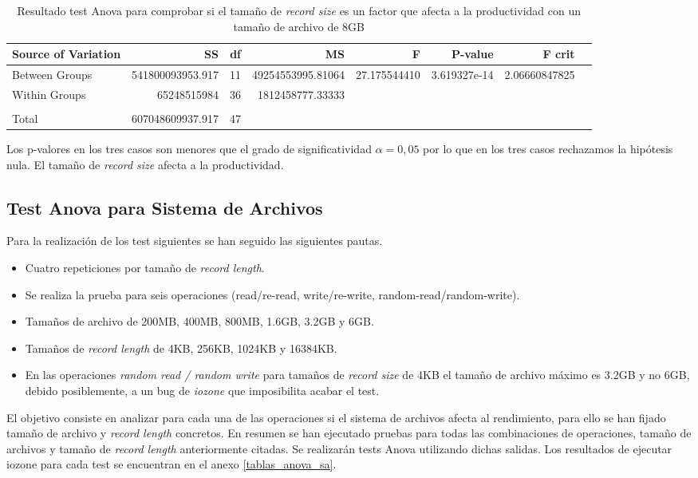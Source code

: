 \begin{table}[!htp]\centering

\scriptsize
\begin{tabular}{lrrrrrrr}\toprule
Source of Variation &SS &df &MS &F &P-value &F crit \\\midrule
Between Groups &541800093953.917 &11 &49254553995.81064 &27.175544410 &3.619327e-14 &2.06660847825 \\
Within Groups &65248515984 &36 &1812458777.33333 & & & \\
& & & & & & \\
Total &607048609937.917 &47 & & & & \\
\bottomrule
\end{tabular}
\caption{Resultado test Anova para comprobar si el tamaño de \textit{record size} es un factor que afecta a la productividad con un tamaño de archivo de 8GB}\label{tab: }
\end{table}


Los p-valores en los tres casos son menores que el grado de significatividad $\alpha = 0,05$ por lo que en los tres casos rechazamos la hipótesis nula. El tamaño de \textit{record size} afecta a la productividad.

\subsection{Test Anova para Sistema de Archivos}
Para la realización de los test siguientes se han seguido las siguientes pautas.
\begin{itemize}
    \item Cuatro repeticiones por tamaño de \textit{record length}.
    \item Se realiza la prueba para seis operaciones (read/re-read, write/re-write, random-read/random-write).
    \item Tamaños de archivo de 200MB, 400MB, 800MB, 1.6GB, 3.2GB y 6GB.
    \item Tamaños de \textit{record length} de 4KB, 256KB, 1024KB y 16384KB.
    \item En las operaciones \textit{random read / random write} para tamaños de \textit{record size} de 4KB el tamaño de archivo máximo es 3.2GB y no 6GB, debido posiblemente, a un bug de \textit{iozone} que imposibilita acabar el test.
\end{itemize}

El objetivo consiste en analizar para cada una de las operaciones si el sistema de archivos afecta al rendimiento, para ello se han fijado tamaño de archivo y \textit{record length} concretos. En resumen se han ejecutado pruebas para todas las combinaciones de operaciones, tamaño de archivos y tamaño de \textit{record length} anteriormente citadas. Se realizarán tests Anova utilizando dichas salidas. Los resultados de ejecutar iozone para cada test se encuentran en el anexo \ref{tablas_anova_sa}.\\

